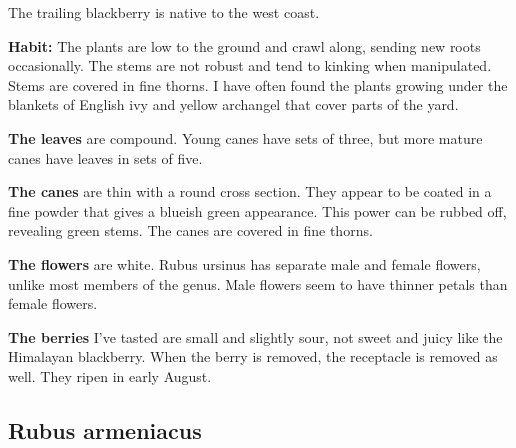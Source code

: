 The trailing blackberry is native to the west coast.

\textbf{Habit:} The plants are low to the ground and crawl along, sending new roots occasionally. The stems are not robust and tend to kinking when manipulated. Stems are covered in fine thorns. I have often found the plants growing under the blankets of English ivy and yellow archangel that cover parts of the yard.

\textbf{The leaves} are compound. Young canes have sets of three, but more mature canes have leaves in sets of five.

\textbf{The canes} are thin with a round cross section. They appear to be coated in a fine powder that gives a blueish green appearance. This power can be rubbed off, revealing green stems. The canes are covered in fine thorns.

\textbf{The flowers} are white. Rubus ursinus has separate male and female flowers, unlike most members of the genus. Male flowers seem to have thinner petals than female flowers.

\textbf{The berries} I've tasted are small and slightly sour, not sweet and juicy like the Himalayan blackberry. When the berry is removed, the receptacle is removed as well. They ripen in early August. 


\newpage

\subsection{Rubus armeniacus}

